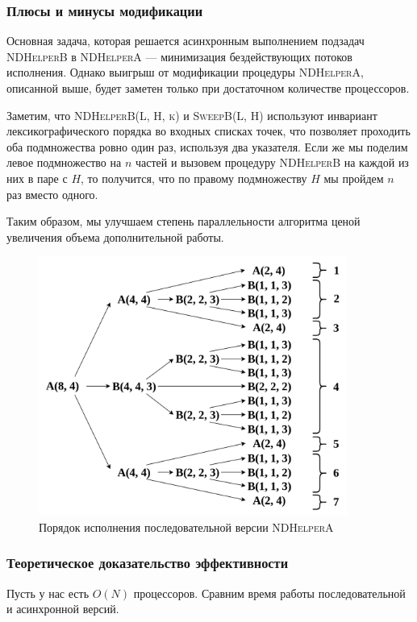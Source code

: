\subsubsection{Плюсы и минусы модификации}
Основная задача, которая решается асинхронным выполнением подзадач \textsc{NDHelperB} в \textsc{NDHelperA} --- минимизация бездействующих потоков исполнения.
Однако выигрыш от модификации процедуры \textsc{NDHelperA}, описанной выше, будет заметен только при достаточном количестве процессоров.

Заметим, что \textsc{NDHelperB(L, H, k)} и \textsc{SweepB(L, H)} используют инвариант лексикографического порядка во входных списках точек, что позволяет проходить оба подмножества ровно один раз, используя два указателя.
Если же мы поделим левое подмножество на $n$ частей и вызовем процедуру \textsc{NDHelperB} на каждой из них в паре с $H$, то получится, что по правому подмножеству $H$ мы пройдем $n$ раз вместо одного.

Таким образом, мы улучшаем степень параллельности алгоритма ценой увеличения объема дополнительной работы.

\begin{figure}[h]
\centering
\includegraphics[width=0.9\textwidth]{images/sequential.png}
    \caption{Порядок исполнения последовательной версии \textsc{NDHelperA}}
\end{figure}

\subsubsection{Теоретическое доказательство эффективности}
Пусть у нас есть $O(N)$ процессоров. Сравним время работы последовательной и асинхронной версий.

